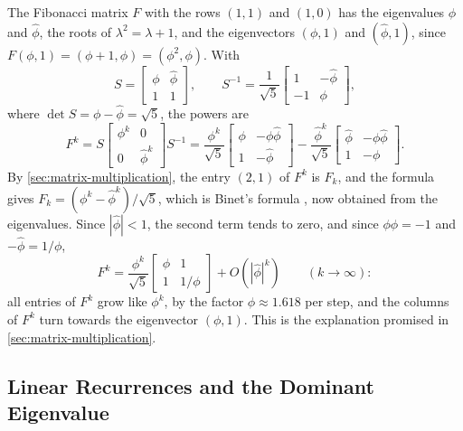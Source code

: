 The Fibonacci matrix $F$ with the rows $(1,1)$ and $(1,0)$ has the eigenvalues $\phi$ and $\hat\phi$, the roots of $\lambda^2=\lambda+1$, and the eigenvectors $(\phi,1)$ and $(\hat\phi,1)$, since $F(\phi,1)=(\phi+1,\phi)=(\phi^2,\phi)$. With
\[
S=\begin{bmatrix}\phi&\hat\phi\\1&1\end{bmatrix},\qquad S^{-1}=\frac1{\sqrt5}\begin{bmatrix}1&-\hat\phi\\-1&\phi\end{bmatrix},
\]
where $\det S=\phi-\hat\phi=\sqrt5$, the powers are
\[
F^k=S\begin{bmatrix}\phi^k&0\\0&\hat\phi^k\end{bmatrix}S^{-1}=\frac{\phi^k}{\sqrt5}\begin{bmatrix}\phi&-\phi\hat\phi\\1&-\hat\phi\end{bmatrix}-\frac{\hat\phi^k}{\sqrt5}\begin{bmatrix}\hat\phi&-\phi\hat\phi\\1&-\phi\end{bmatrix}.
\]
By \cref{sec:matrix-multiplication}, the entry $(2,1)$ of $F^k$ is $F_k$, and the formula gives $F_k=(\phi^k-\hat\phi^k)/\sqrt5$, which is Binet's formula , now obtained from the eigenvalues. Since $|\hat\phi|<1$, the second term tends to zero, and since $\phi\hat\phi=-1$ and $-\hat\phi=1/\phi$,
\[
F^k=\frac{\phi^k}{\sqrt5}\begin{bmatrix}\phi&1\\1&1/\phi\end{bmatrix}+O(|\hat\phi|^k)\qquad(k\to\infty):
\]
all entries of $F^k$ grow like $\phi^k$, by the factor $\phi\approx1.618$ per step, and the columns of $F^k$ turn towards the eigenvector $(\phi,1)$. This is the explanation promised in \cref{sec:matrix-multiplication}.

\subsection{Linear Recurrences and the Dominant Eigenvalue}

